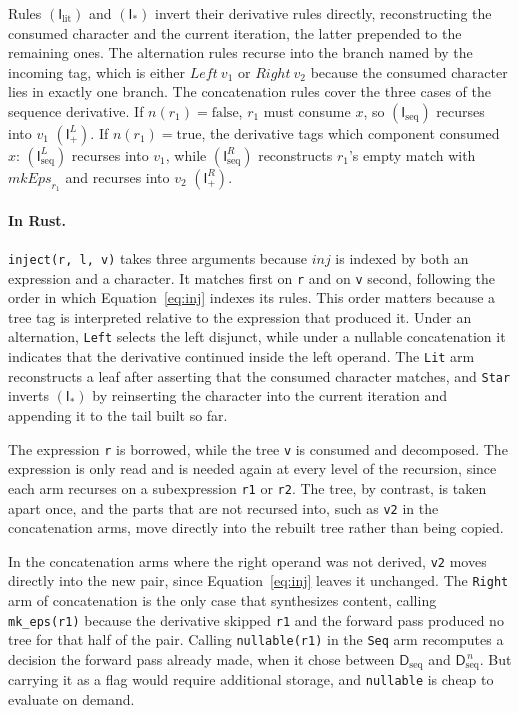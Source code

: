 Rules $(\mathsf{I}_{\mathrm{lit}})$ and $(\mathsf{I}_{*})$ 
invert their derivative rules directly, 
reconstructing the consumed character and the current iteration, 
the latter prepended to the remaining ones.
The alternation rules recurse into the branch named by the incoming tag, 
which is either $\mathit{Left}\ v_1$ or $\mathit{Right}\ v_2$ 
because the consumed character lies in exactly one branch.
The concatenation rules cover the three cases of the sequence derivative. 
If $n(r_1) = \mathrm{false}$, $r_1$ must consume $x$, 
so $(\mathsf{I}_{\mathrm{seq}})$ recurses into $v_1$ $(\mathsf{I}_{+}^{L})$.
If $n(r_1) = \mathrm{true}$, 
the derivative tags which component consumed $x$: 
$(\mathsf{I}_{\mathrm{seq}}^{L})$ recurses into $v_1$, while
$(\mathsf{I}_{\mathrm{seq}}^{R})$ reconstructs $r_1$'s empty match 
with $\mathit{mkEps}_{r_1}$ and recurses into $v_2$ $(\mathsf{I}_{+}^{R})$.

%

\paragraph{In Rust.}
\label{sec:inject-impl}

\texttt{inject(r, l, v)} takes three arguments because $\mathit{inj}$ is
indexed by both an expression and a character.
It matches first on \texttt{r} and on \texttt{v} second, 
following the order in which Equation~\eqref{eq:inj} indexes its rules. 
This order matters because a tree tag is interpreted relative 
to the expression that produced it. 
Under an alternation, \texttt{Left} selects the left disjunct, 
while under a nullable concatenation it indicates 
that the derivative continued inside the left operand. 
The \texttt{Lit} arm reconstructs a leaf after asserting 
that the consumed character matches,
and \texttt{Star} inverts $(\mathsf{I}_{*})$ 
by reinserting the character into the current iteration 
and appending it to the tail built so far.

The expression \texttt{r} is borrowed, 
while the tree \texttt{v} is consumed and decomposed. 
The expression is only read and is needed again 
at every level of the recursion, 
since each arm recurses on a subexpression \texttt{r1} or \texttt{r2}. 
The tree, by contrast, is taken apart once, 
and the parts that are not recursed into, 
such as \texttt{v2} in the concatenation arms, 
move directly into the rebuilt tree rather than being copied.

In the concatenation arms where the right operand was not derived,
\texttt{v2} moves directly into the new pair, 
since Equation~\eqref{eq:inj} leaves it unchanged. 
The \texttt{Right} arm of concatenation is the only case that synthesizes content, 
calling \texttt{mk\_eps(r1)} because the derivative skipped \texttt{r1} 
and the forward pass produced no tree for that half of the pair. 
Calling \texttt{nullable(r1)} in the \texttt{Seq} arm recomputes a decision 
the forward pass already made, 
when it chose between $\mathsf{D}_{\mathrm{seq}}$ and $\mathsf{D}_{\mathrm{seq}}^{\,n}$.
But carrying it as a flag would require additional storage, 
and \texttt{nullable} is cheap to evaluate on demand.

